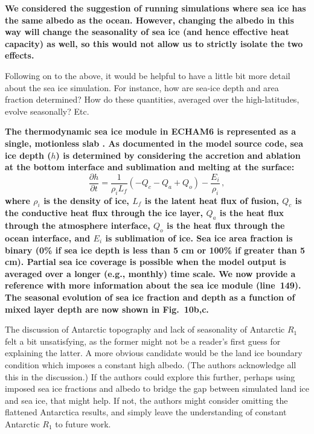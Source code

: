 \documentclass{article}
\begin{document}
\textbf{We considered the suggestion of running simulations where sea ice has the same albedo as the ocean. However, changing the albedo in this way will change the seasonality of sea ice (and hence effective heat capacity) as well, so this would not allow us to strictly isolate the two effects.}

Following on to the above, it would be helpful to have a little bit more detail about the sea ice simulation. For instance, how are sea-ice depth and area fraction determined? How do these quantities, averaged over the high-latitudes, evolve seasonally? Etc.

\textbf{The thermodynamic sea ice module in ECHAM6 is represented as a single, motionless slab \citep{giorgetta2013}. As documented in the model source code, sea ice depth ($h$) is determined by considering the accretion and ablation at the bottom interface and sublimation and melting at the surface:}
\begin{equation}
    \frac{\partial h}{\partial t} = \frac{1}{\rho_i L_f} \left(-Q_c - Q_a + Q_o\right) - \frac{E_i}{\rho_i}\, ,
\end{equation}
\textbf{where $\rho_i$ is the density of ice, $L_f$ is the latent heat flux of fusion, $Q_c$ is the conductive heat flux through the ice layer, $Q_a$ is the heat flux through the atmosphere interface, $Q_o$ is the heat flux through the ocean interface, and $E_i$ is sublimation of ice. Sea ice area fraction is binary (0\% if sea ice depth is less than 5 cm or 100\% if greater than 5 cm). Partial sea ice coverage is possible when the model output is averaged over a longer (e.g., monthly) time scale. We now provide a reference with more information about the sea ice module (line~149). The seasonal evolution of sea ice fraction and depth as a function of mixed layer depth are now shown in Fig.~10b,c.}

The discussion of Antarctic topography and lack of seasonality of Antarctic $R_1$ felt a bit unsatisfying, as the former might not be a reader's first guess for explaining the latter. A more obvious candidate would be the land ice boundary condition which imposes a constant high albedo. (The authors acknowledge all this in the discussion.) If the authors could explore this further, perhaps using imposed sea ice fractions and albedo to bridge the gap between simulated land ice and sea ice, that might help. If not, the authors might consider omitting the flattened Antarctica results, and simply leave the understanding of constant Antarctic $R_1$ to future work.
\end{document}
